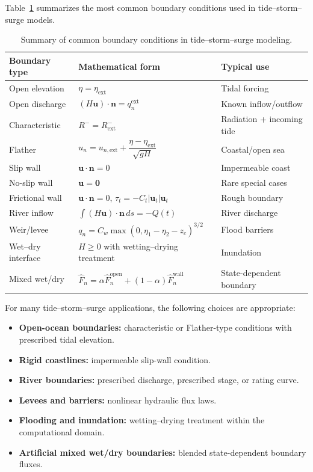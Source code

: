 \documentclass[11pt]{article}
\begin{document}
Table~\ref{tab:bc-summary} summarizes the most common boundary conditions used in tide--storm--surge models.

\begin{table}[h!]
\centering
\caption{Summary of common boundary conditions in tide--storm--surge modeling.}
\label{tab:bc-summary}
\begin{tabular}{@{}lll@{}}
\toprule
Boundary type & Mathematical form & Typical use \\ \midrule
Open elevation & \(\eta=\eta_{\mathrm{ext}}\) & Tidal forcing \\
Open discharge & \((H\bm{u})\cdot\bm{n}=q_n^{\mathrm{ext}}\) & Known inflow/outflow \\
Characteristic & \(R^- = R^-_{\mathrm{ext}}\) & Radiation + incoming tide \\
Flather & \(u_n=u_{n,\mathrm{ext}}+\dfrac{\eta-\eta_{\mathrm{ext}}}{\sqrt{gH}}\) & Coastal/open sea \\
Slip wall & \(\bm{u}\cdot\bm{n}=0\) & Impermeable coast \\
No-slip wall & \(\bm{u}=\bm{0}\) & Rare special cases \\
Frictional wall & \(\bm{u}\cdot\bm{n}=0\), \(\tau_t=-C_t|\bm{u}_t|\bm{u}_t\) & Rough boundary \\
River inflow & \(\int (H\bm{u})\cdot\bm{n}\,ds=-Q(t)\) & River discharge \\
Weir/levee & \(q_n=C_w \max(0,\eta_1-\eta_2-z_c)^{3/2}\) & Flood barriers \\
Wet--dry interface & \(H\ge 0\) with wetting--drying treatment & Inundation \\
Mixed wet/dry & \(\widehat{F}_n=\alpha \widehat{F}_n^{\mathrm{open}}+(1-\alpha)\widehat{F}_n^{\mathrm{wall}}\) & State-dependent boundary \\ \bottomrule
\end{tabular}
\end{table}


For many tide--storm--surge applications, the following choices are appropriate:
\begin{itemize}[leftmargin=2em]
    \item \textbf{Open-ocean boundaries:} characteristic or Flather-type conditions with prescribed tidal elevation.
    \item \textbf{Rigid coastlines:} impermeable slip-wall condition.
    \item \textbf{River boundaries:} prescribed discharge, prescribed stage, or rating curve.
    \item \textbf{Levees and barriers:} nonlinear hydraulic flux laws.
    \item \textbf{Flooding and inundation:} wetting--drying treatment within the computational domain.
    \item \textbf{Artificial mixed wet/dry boundaries:} blended state-dependent boundary fluxes.
\end{itemize}
\end{document}
